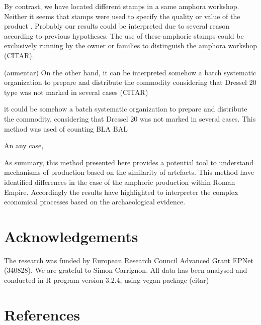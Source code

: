 \documentclass[review]{elsarticle}
\begin{document}
By contrast, we have located different stamps in a same amphora workshop. Neither it seems that stamps were used to specify the quality or value of the product \citep{callender}. Probably our results could be interpreted due to several reason according to previous hypotheses. The use of these amphoric stamps could be exclusively running by the owner or families to distinguish the amphora workshop (CITAR). 

(aumentar)
On the other hand, it can be interpreted somehow a batch systematic organization to prepare and distribute the commodity considering that Dressel 20 type was not marked in several cases (CITAR)


it could be somehow a batch systematic organization to prepare and distribute the commodity, considering that Dressel 20 was not marked in several cases. This method was used of counting BLA BAL 

 

An any case, 

As summary, this method presented here provides a potential tool to understand mechanisms of production based on the similarity of artefacts. This method have identified differences in the case of the amphoric production within Roman Empire. Accordingly the results have highlighted to interpreter the complex economical processes based on  the archaeological evidence. 






\section{Acknowledgements}

The research was funded by European Research Council Advanced Grant EPNet (340828). We are grateful to Simon Carrignon. 
All data has been analysed and conducted in R program version 3.2.4, using vegan package (citar) 


\section{References}


\end{document}
